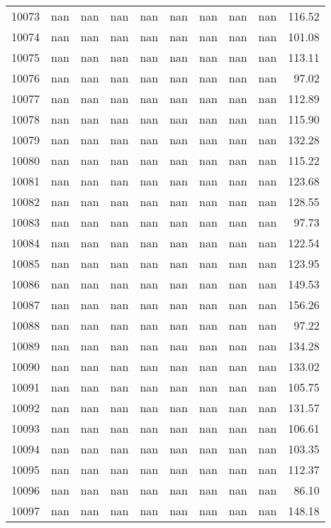 \begin{tabular}{lrrrrrrrrr}
10073 & nan & nan & nan & nan & nan & nan & nan & nan & 116.52 \\
10074 & nan & nan & nan & nan & nan & nan & nan & nan & 101.08 \\
10075 & nan & nan & nan & nan & nan & nan & nan & nan & 113.11 \\
10076 & nan & nan & nan & nan & nan & nan & nan & nan & 97.02 \\
10077 & nan & nan & nan & nan & nan & nan & nan & nan & 112.89 \\
10078 & nan & nan & nan & nan & nan & nan & nan & nan & 115.90 \\
10079 & nan & nan & nan & nan & nan & nan & nan & nan & 132.28 \\
10080 & nan & nan & nan & nan & nan & nan & nan & nan & 115.22 \\
10081 & nan & nan & nan & nan & nan & nan & nan & nan & 123.68 \\
10082 & nan & nan & nan & nan & nan & nan & nan & nan & 128.55 \\
10083 & nan & nan & nan & nan & nan & nan & nan & nan & 97.73 \\
10084 & nan & nan & nan & nan & nan & nan & nan & nan & 122.54 \\
10085 & nan & nan & nan & nan & nan & nan & nan & nan & 123.95 \\
10086 & nan & nan & nan & nan & nan & nan & nan & nan & 149.53 \\
10087 & nan & nan & nan & nan & nan & nan & nan & nan & 156.26 \\
10088 & nan & nan & nan & nan & nan & nan & nan & nan & 97.22 \\
10089 & nan & nan & nan & nan & nan & nan & nan & nan & 134.28 \\
10090 & nan & nan & nan & nan & nan & nan & nan & nan & 133.02 \\
10091 & nan & nan & nan & nan & nan & nan & nan & nan & 105.75 \\
10092 & nan & nan & nan & nan & nan & nan & nan & nan & 131.57 \\
10093 & nan & nan & nan & nan & nan & nan & nan & nan & 106.61 \\
10094 & nan & nan & nan & nan & nan & nan & nan & nan & 103.35 \\
10095 & nan & nan & nan & nan & nan & nan & nan & nan & 112.37 \\
10096 & nan & nan & nan & nan & nan & nan & nan & nan & 86.10 \\
10097 & nan & nan & nan & nan & nan & nan & nan & nan & 148.18 \\

\end{tabular}
